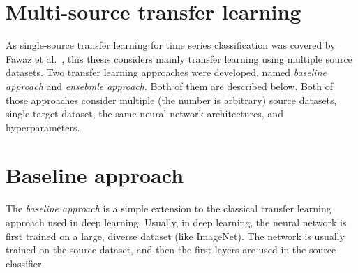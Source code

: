 \documentclass[a4paper,11pt,twoside]{report}
\theoremstyle{definition}
\begin{document}
\begin{table}[!h]
\caption{Summary of hyperparameters.}
\centering
\tabcolsep=0.11cm
\label{table:hyperparams}
\end{table}
\FloatBarrier
\section{Multi-source transfer learning}
As single-source transfer learning for time series classification was covered by Fawaz et al.~\cite{transfer_learning_time_series}, this thesis considers mainly transfer learning using multiple source datasets. Two transfer learning approaches were developed, named \textit{baseline approach} and \textit{ensebmle approach}. Both of them are described below. Both of those approaches consider multiple (the number is arbitrary) source datasets, single target dataset, the same neural network architectures, and hyperparameters.

\section{Baseline approach}\label{section:baseline}
The \textit{baseline approach} is a simple extension to the classical transfer learning approach used in deep learning. Usually, in deep learning, the neural network is first trained on a large, diverse dataset (like ImageNet). The network is usually trained on the source dataset, and then the first layers are used in the source classifier.
\end{document}
